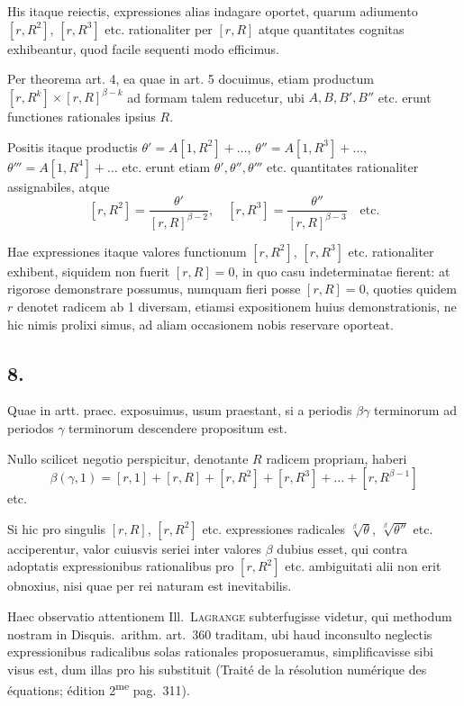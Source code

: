 \documentclass[12pt,a4paper]{article}
\begin{document}
His itaque reiectis, expressiones alias indagare oportet, quarum adiumento $[r,R^2]$, $[r,R^3]$ etc. rationaliter per $[r,R]$ atque quantitates cognitas exhibeantur, quod facile sequenti modo efficimus.

Per theorema art. 4, ea quae in art. 5 docuimus, etiam productum $[r,R^k] \times [r,R]^{\beta-k}$ ad formam talem reducetur, ubi $A, B, B', B''$ etc. erunt functiones rationales ipsius $R$.

Positis itaque productis $\theta' = A[1,R^2] + \ldots$, $\theta'' = A[1,R^3] + \ldots$, $\theta''' = A[1,R^4] + \ldots$ etc. erunt etiam $\theta', \theta'', \theta'''$ etc. quantitates rationaliter assignabiles, atque
\[
[r,R^2] = \frac{\theta'}{[r,R]^{\beta-2}}, \quad [r,R^3] = \frac{\theta''}{[r,R]^{\beta-3}} \quad\text{etc.}
\]

Hae expressiones itaque valores functionum $[r,R^2]$, $[r,R^3]$ etc. rationaliter exhibent, siquidem non fuerit $[r,R]=0$, in quo casu indeterminatae fierent: at rigorose demonstrare possumus, numquam fieri posse $[r,R]=0$, quoties quidem $r$ denotet radicem ab 1 diversam, etiamsi expositionem huius demonstrationis, ne hic nimis prolixi simus, ad aliam occasionem nobis reservare oporteat.

\subsection*{8.}

Quae in artt. praec. exposuimus, usum praestant, si a periodis $\beta\gamma$ terminorum ad periodos $\gamma$ terminorum descendere propositum est.

Nullo scilicet negotio perspicitur, denotante $R$ radicem propriam, haberi
\[
\beta(\gamma,1) = [r,1] + [r,R] + [r,R^2] + [r,R^3] + \ldots + [r,R^{\beta-1}]
\]
etc.

Si hic pro singulis $[r,R]$, $[r,R^2]$ etc. expressiones radicales $\sqrt[\beta]{\theta}$, $\sqrt[\beta]{\theta''}$ etc. acciperentur, valor cuiusvis seriei inter valores $\beta$ dubius esset, qui contra adoptatis expressionibus rationalibus pro $[r,R^2]$ etc. ambiguitati alii non erit obnoxius, nisi quae per rei naturam est inevitabilis.

Haec observatio attentionem Ill.\ \textsc{Lagrange} subterfugisse videtur, qui methodum nostram in Disquis.\ arithm. art.\ 360 traditam, ubi haud inconsulto neglectis expressionibus radicalibus solas rationales proposueramus, simplificavisse sibi visus est, dum illas pro his substituit (Trait\'e de la r\'esolution num\'erique des \'equations; \'edition 2\textsuperscript{me} pag.\ 311).
\end{document}
